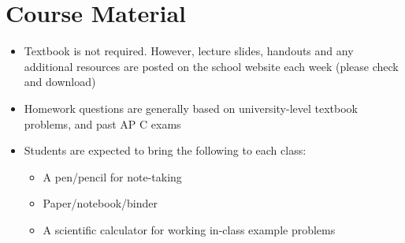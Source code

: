 \documentclass{../../oss-handout}
\begin{document}



\section*{Course Material}
\begin{itemize}[topsep=0pt,noitemsep,leftmargin=18pt]
\item Textbook is not required. However, lecture slides, handouts and any
  additional resources are posted on the school website each week (please check
  and download)
\item Homework questions are generally based on university-level textbook
  problems, and past AP C exams
\item Students are expected to bring the following to each class:
  \begin{itemize}[noitemsep,topsep=0pt]
  \item A pen/pencil for note-taking
  \item Paper/notebook/binder
  \item A scientific calculator for working in-class example problems
  \end{itemize}
\end{itemize}
\end{document}
